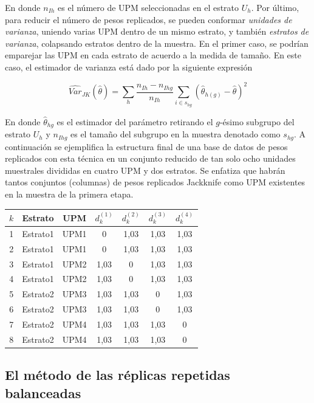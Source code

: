 \documentclass[
  12pt,
  spanish,
]{book}
\begin{document}
En donde \(n_{Ih}\) es el número de UPM seleccionadas en el estrato \(U_h\). Por último, para reducir el número de pesos replicados, se pueden conformar \emph{unidades de varianza}, uniendo varias UPM dentro de un mismo estrato, y también \emph{estratos de varianza}, colapsando estratos dentro de la muestra. En el primer caso, se podrían emparejar las UPM en cada estrato de acuerdo a la medida de tamaño. En este caso, el estimador de varianza está dado por la siguiente expresión

\[
\widehat{Var}_{JK}(\hat{\theta}) = \sum_h \frac{n_{Ih}-n_{Ihg}}{n_{Ih}} 
\sum_{i \in s_{hg}} (\hat{\theta}_{h(g)} - \hat{\theta})^2
\]

En donde \(\hat{\theta}_{hg}\) es el estimador del parámetro retirando el \(g\)-ésimo subgrupo del estrato \(U_h\) y \(n_{Ihg}\) es el tamaño del subgrupo en la muestra denotado como \(s_{hg}\). A continuación se ejemplifica la estructura final de una base de datos de pesos replicados con esta técnica en un conjunto reducido de tan solo ocho unidades muestrales divididas en cuatro UPM y dos estratos. Se enfatiza que habrán tantos conjuntos (columnas) de pesos replicados Jackknife como UPM existentes en la muestra de la primera etapa.

\begin{longtable}[]{@{}ccccccc@{}}
\toprule
\(k\) & Estrato & UPM & \(d_k^{(1)}\) & \(d_k^{(2)}\) & \(d_k^{(3)}\) & \(d_k^{(4)}\) \\
\midrule
\endhead
1 & Estrato1 & UPM1 & 0 & 1,03 & 1,03 & 1,03 \\
2 & Estrato1 & UPM1 & 0 & 1,03 & 1,03 & 1,03 \\
3 & Estrato1 & UPM2 & 1,03 & 0 & 1,03 & 1,03 \\
4 & Estrato1 & UPM2 & 1,03 & 0 & 1,03 & 1,03 \\
5 & Estrato2 & UPM3 & 1,03 & 1,03 & 0 & 1,03 \\
6 & Estrato2 & UPM3 & 1,03 & 1,03 & 0 & 1,03 \\
7 & Estrato2 & UPM4 & 1,03 & 1,03 & 1,03 & 0 \\
8 & Estrato2 & UPM4 & 1,03 & 1,03 & 1,03 & 0 \\
\bottomrule
\end{longtable}

\hypertarget{el-muxe9todo-de-las-ruxe9plicas-repetidas-balanceadas}{%
\subsection{El método de las réplicas repetidas balanceadas}\label{el-muxe9todo-de-las-ruxe9plicas-repetidas-balanceadas}}
\end{document}
